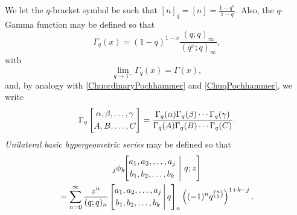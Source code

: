 \documentclass[12pt]{article}
\begin{document}
 We let the {$q$-bracket symbol} be such that $[n]_{q} = [n] = \frac{1-q^n}{1-q}$. 
 Also, the $q$-Gamma function may be defined so that 
 $$ \Gamma_{q}(x) = (1-q)^{1-x} \frac{ (q;q)_{\infty} }{ (q^x;q)_{\infty} }, $$ with 
\begin{equation}\label{limitqGammaGamma}
 \lim_{q\to 1^{-}} \Gamma_{q}(x) = \Gamma(x), 
\end{equation}
 and, by analogy with 
 \eqref{ChuordinaryPochhammer} and \eqref{ChuqPochhammer}, we write 
\begin{equation*}
 \Gamma_{q} \left[ \begin{matrix} \alpha, \beta, \ldots, \gamma \vspace{1mm} \\ 
 A, B, \ldots, C \end{matrix} \right] 
 = \frac{ \Gamma_{q}(\alpha) \Gamma_{q}(\beta) \cdots \Gamma_{q}(\gamma) }{ 
 \Gamma_{q}(A) \Gamma_{q}(B) \cdots \Gamma_{q}(C) }. 
 \end{equation*}
 \emph{Unilateral basic hypergeometric series} may be defined so that 
\begin{multline*}
 {}_{j}\phi_{k}\!\!\left[ \begin{matrix} 
 a_{1}, a_{2}, \ldots, a_{j} \vspace{1mm}\\ 
 b_{1}, b_{2}, \ldots, b_{k} \end{matrix} \ \Bigg| \ q; z 
 \right] \\ 
 = \sum_{n=0}^{\infty} \frac{z^n}{ (q;q)_{n} } 
 \left[ \begin{matrix} 
 a_{1}, a_{2}, \ldots, a_{j} \vspace{1mm} \\ 
 b_{1}, b_{2}, \ldots, b_{k} \end{matrix} \, \Bigg| \, q \right]_{n} 
 \left( (-1)^{n} q^{\binom{n}{2}} \right)^{1 + k - j}. 
\end{multline*}
\end{document}
